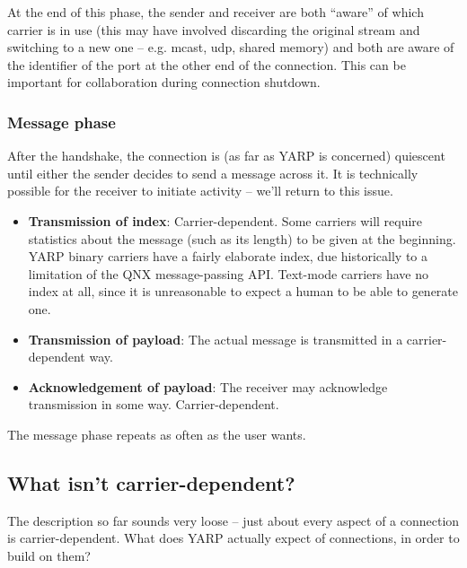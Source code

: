 At the end of this phase, the sender and receiver are both ``aware''
of which carrier is in use (this may have involved discarding the
original stream and switching to a new one -- e.g. mcast, udp, shared
memory) and both are aware of the identifier of the port at the
other end of the connection.  This can be important for collaboration
during connection shutdown.


\subsubsection{Message phase}

After the handshake, the connection is (as far as YARP is concerned)
quiescent until either the sender decides to send a message across it.
It is technically possible for the receiver to initiate activity --
we'll return to this issue.

\begin{itemize}

\item {\bf Transmission of index}: Carrier-dependent. Some carriers
will require statistics about the message (such as its length) to be
given at the beginning.  YARP binary carriers have a fairly elaborate
index, due historically to a limitation of the QNX message-passing
API.  Text-mode carriers have no index at all, since it is
unreasonable to expect a human to be able to generate one.

\item {\bf Transmission of payload}: The actual message is
transmitted in a carrier-dependent way.

\item {\bf Acknowledgement of payload}: The receiver may 
acknowledge transmission in some way.  Carrier-dependent.

\end{itemize}

The message phase repeats as often as the user wants.


\subsection{What isn't carrier-dependent?}

The description so far sounds very loose -- just about every aspect
of a connection is carrier-dependent.  What does YARP actually
expect of connections, in order to build on them?

